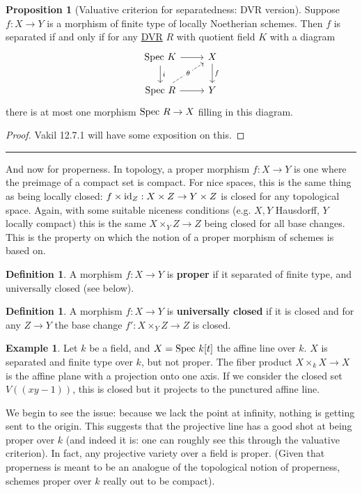 \documentclass[10pt,reqno]{amsart}
\theoremstyle{definition}
\newtheorem{example}[theorem]{Example}
\newtheorem{definition}[theorem]{Definition}
\newtheorem{proposition}[theorem]{Proposition}
\theoremstyle{remark}
\numberwithin{equation}{section}
\numberwithin{theorem}{section}
\newcommand{\spec}{\textup{Spec }}
\begin{document}
\begin{proposition}[Valuative criterion for separatedness: DVR version] Suppose $f: X \to Y$ is a morphism of finite type of locally Noetherian schemes. Then $f$ is separated if and only if for any \underline{DVR} $R$ with quotient field $K$ with a diagram
\[
\begin{tikzcd}
\spec K \arrow[d,"i"] \arrow[r] & X \arrow[d,"f"]\\
\spec R \arrow[r] \arrow[ur,dashed, "\theta" description]& Y
\end{tikzcd}
\]
there is at most one morphism $\spec R \to X$ filling in this diagram.
\end{proposition}
\begin{proof}
Vakil 12.7.1 will have some exposition on this.
\end{proof}

\hrule
\vspace{1em}

And now for properness. In topology, a proper morphism $f: X \to Y$ is one where the preimage of a compact set is compact. For nice spaces, this is the same thing as being locally closed: $f \times \textup{id}_Z: X \times Z \to Y \times Z$ is closed for any topological space. Again, with some suitable niceness conditions (e.g. $X,Y$ Hausdorff, $Y$ locally compact) this is the same $X \times_Y Z \to Z$ being closed for all base changes. This is the property on which the notion of a proper morphism of schemes is based on.

\begin{definition} A morphism $f: X \to Y$ is \textbf{proper} if it separated of finite type, and universally closed (see below).
\end{definition}

\begin{definition} A morphism $f: X \to Y$ is \textbf{universally closed} if it is closed and for any $Z \to Y$ the base change $f': X \times_Y Z \to Z$ is closed.
\end{definition}

\begin{example} Let $k$ be a field, and $X = \spec k[t]$ the affine line over $k$. $X$ is separated and finite type over $k$, but not proper. The fiber product $X \times_k X \to X$ is the affine plane with a projection onto one axis. If we consider the closed set $V((xy-1))$, this is closed but it projects to the punctured affine line.

We begin to see the issue: because we lack the point at infinity, nothing is getting sent to the origin. This suggests that the projective line has a good shot at being proper over $k$ (and indeed it is: one can roughly see this through the valuative criterion). In fact, any projective variety over a field is proper. (Given that properness is meant to be an analogue of the topological notion of properness, schemes proper over $k$ really out to be compact).
\end{example}
\end{document}

